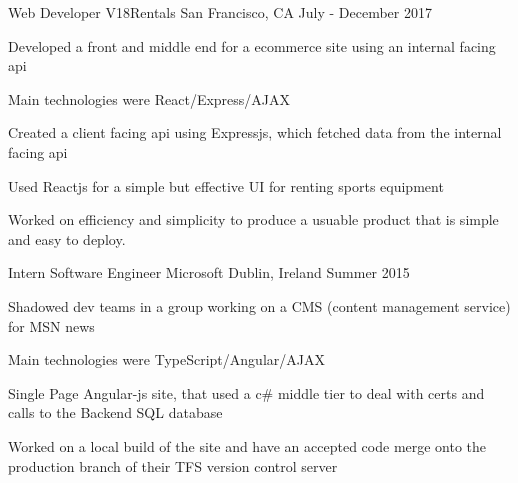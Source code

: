 

\begin{cventries}



  \cventry
    {Web Developer} %
    {V18Rentals} %
    {San Francisco, CA} %
    {July - December 2017} %
    {
      \begin{cvitems} %
        \item {Developed a front and middle end for a ecommerce site using an internal facing api}
        \item {Main technologies were React/Express/AJAX}
        \item {Created a client facing api using Expressjs, which fetched data from the internal facing api}
        \item {Used Reactjs for a simple but effective UI for renting sports equipment}
        \item {Worked on efficiency and simplicity to produce a usuable product that is simple and easy to deploy.}
      \end{cvitems}
    }


  \cventry
    {Intern Software Engineer} %
    {Microsoft} %
    {Dublin, Ireland} %
    {Summer 2015} %
    {
      \begin{cvitems} %
        \item {Shadowed dev teams in a group working on a CMS (content management service) for MSN news}
        \item {Main technologies were TypeScript/Angular/AJAX}
        \item {Single Page Angular-js site, that used a c\# middle tier to deal with certs and calls to the Backend SQL database}
        \item {Worked on a local build of the site and have an accepted code merge onto the production branch of their TFS version control server}
      \end{cvitems}
    }



\end{cventries}
